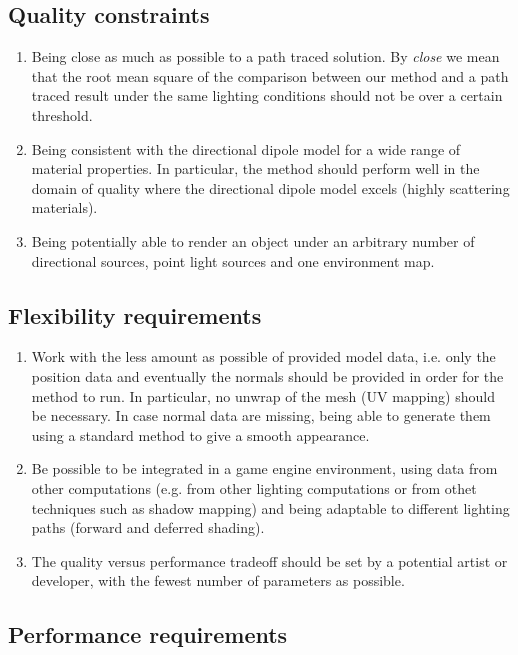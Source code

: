 \subsection{Quality constraints}
\begin{enumerate}
	\item Being close as much as possible to a path traced solution. By \emph{close} we mean that the root mean square of the comparison between our method and a path traced result under the same lighting conditions should not be over a certain threshold. 
	\item Being consistent with the directional dipole model for a wide range of material properties. In particular, the method should perform well in the domain of quality where the directional dipole model excels (highly scattering materials).
	\item Being potentially able to render an object under an arbitrary number of directional sources, point light sources and one environment map.
\end{enumerate}

\subsection{Flexibility requirements}	
\begin{enumerate}
	\item Work with the less amount as possible of provided model data, i.e. only the position data and eventually the normals should be provided in order for the method to run. In particular, no unwrap of the mesh (UV mapping) should be necessary. In case normal data are missing,  being able to generate them using a standard method to give a smooth appearance.
	\item Be possible to be integrated in a game engine environment, using data from other computations (e.g. from other lighting computations or from othet techniques such as shadow mapping) and being adaptable to different lighting paths (forward and deferred shading).
  \item The quality versus performance tradeoff should be set by a potential artist or developer, with the fewest number of parameters as possible.
\end{enumerate}

\subsection{Performance requirements}

